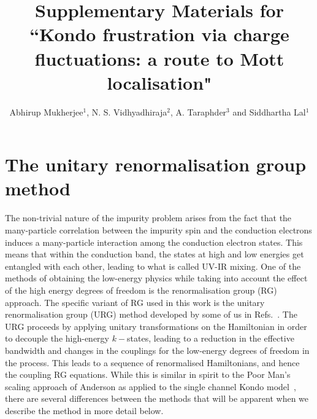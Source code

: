 \documentclass{iopart}
\begin{document}
\title{Supplementary Materials for ``Kondo frustration via charge fluctuations: a route to Mott localisation"}

\author{Abhirup Mukherjee$^1$, N. S. Vidhyadhiraja$^2$, A. Taraphder$^3$ and Siddhartha Lal$^1$}
\address{$^1$Department of Physical Sciences, Indian Institute of Science Education and Research-Kolkata, W.B. 741246, India}
\address{$^2$Theoretical Sciences Unit, Jawaharlal Nehru Center for Advanced Scientific Research, Jakkur, Bengaluru 560064, India}
\address{$^3$Department of Physics, Indian Institute of Technology Kharagpur, Kharagpur 721302, India}

\section{The unitary renormalisation group method}

The non-trivial nature of the impurity problem arises from the fact that the many-particle correlation between the impurity spin and the conduction electrons induces a many-particle interaction among the conduction electron states.
This means that within the conduction band, the states at high and low energies get entangled with each other, leading to what is called UV-IR mixing.
One of the methods of obtaining the low-energy physics while taking into account the effect of the high energy degrees of freedom is the renormalisation group (RG) approach.
The specific variant of RG used in this work is the unitary renormalisation group (URG) method developed by some of us in Refs.~\cite{santanukagome,anirbanmott1,anirbanmott2,1dhubjhep,siddharthacpi,anirban_mott_ent,anirban_kondo}.
The URG proceeds by applying unitary transformations on the Hamiltonian in order to decouple the high-energy \(k-\)states, leading to a reduction in the effective bandwidth and changes in the couplings for the low-energy degrees of freedom in the process.
This leads to a sequence of renormalised Hamiltonians, and hence the coupling RG equations.
While this is similar in spirit to the Poor Man's scaling approach of Anderson as applied to the single channel Kondo model~\cite{anderson1970}, there are several differences between the methods that will be apparent when we describe the method in more detail below.
\end{document}

